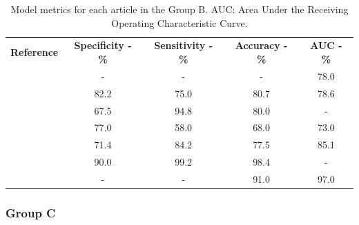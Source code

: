 \documentclass{article}
\begin{document}
\begin{table}[]
    \centering
    \begin{tabular}{ccccc}\toprule
        \multirow{2}{*}{\textbf{Reference}} & \multirow{2}{*}{\textbf{Specificity - \%}} & \multirow{2}{*}{\textbf{Sensitivity - \%}} & \multirow{2}{*}{\textbf{Accuracy - \%}} & \multirow{2}{*}{\textbf{AUC - \%}} \\
        \\\midrule
        \cite{Shoemaker2018}                & -                                          & -                                          & -                                       & 78.0                               \\
        \cite{Koyuncu2019}                  & 82.2                                       & 75.0                                       & 80.7                                    & 78.6                               \\
        \cite{Li2019}                       & 67.5                                       & 94.8                                       & 80.0                                    & -                                  \\
        \cite{Andersen2021}                 & 77.0                                       & 58.0                                       & 68.0                                    & 73.0                               \\
        \cite{Moawad2021}                   & 71.4                                       & 84.2                                       & 77.5                                    & 85.1                               \\
        \cite{Barstugan2020}                & 90.0                                       & 99.2                                       & 98.4                                    & -                                  \\
        \cite{Stanzione2021}                & -                                          & -                                          & 91.0                                    & 97.0                               \\
        \bottomrule
    \end{tabular}
    \caption{Model metrics for each article in the Group B. AUC: Area Under the Receiving Operating Characteristic Curve.}
    \label{tab:res_B}
\end{table}

\subsubsection{Group C}
\end{document}
